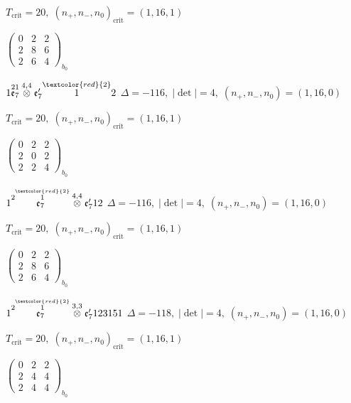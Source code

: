 \documentclass[10pt]{article}
\begin{document}
\hspace{1em}$T_{\text{crit}}=20,\; (n_+,n_-,n_0)_{\text{crit}}=(1,16,1)$

\hspace{2em}$\left(\begin{smallmatrix}0 & 2 & 2 \\ 2 & 8 & 6 \\ 2 & 6 & 4\end{smallmatrix}\right)_{\!b_0}$

\smallskip

$1\overset{21}{\mathfrak{e}_7}\overset{4,4}{\otimes}\mathfrak{e}_7'\overset{\textcolor{red}{2}}{1}2$ \quad $\Delta=-116,\; |\det|=4,\; (n_+,n_-,n_0)=(1,16,0)$

\hspace{1em}$T_{\text{crit}}=20,\; (n_+,n_-,n_0)_{\text{crit}}=(1,16,1)$

\hspace{2em}$\left(\begin{smallmatrix}0 & 2 & 2 \\ 2 & 0 & 2 \\ 2 & 2 & 4\end{smallmatrix}\right)_{\!b_0}$

$1\overset{2\overset{\textcolor{red}{2}}{1}}{\mathfrak{e}_7}\overset{4,4}{\otimes}\mathfrak{e}_7'12$ \quad $\Delta=-116,\; |\det|=4,\; (n_+,n_-,n_0)=(1,16,0)$

\hspace{1em}$T_{\text{crit}}=20,\; (n_+,n_-,n_0)_{\text{crit}}=(1,16,1)$

\hspace{2em}$\left(\begin{smallmatrix}0 & 2 & 2 \\ 2 & 8 & 6 \\ 2 & 6 & 4\end{smallmatrix}\right)_{\!b_0}$

\smallskip

$1\overset{2\overset{\textcolor{red}{2}}{1}}{\mathfrak{e}_7}\overset{3,3}{\otimes}\mathfrak{e}_7'123151$ \quad $\Delta=-118,\; |\det|=4,\; (n_+,n_-,n_0)=(1,16,0)$

\hspace{1em}$T_{\text{crit}}=20,\; (n_+,n_-,n_0)_{\text{crit}}=(1,16,1)$

\hspace{2em}$\left(\begin{smallmatrix}0 & 2 & 2 \\ 2 & 4 & 4 \\ 2 & 4 & 4\end{smallmatrix}\right)_{\!b_0}$
\end{document}
